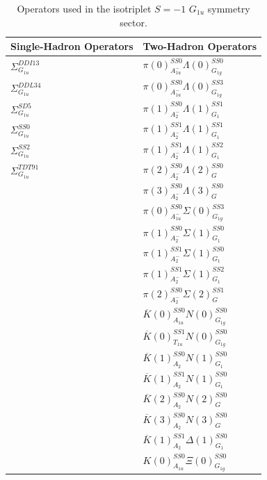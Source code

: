 \begin{table}[H]
    \centering
    \begin{tabular}{l|l}
        \textbf{Single-Hadron Operators} & \textbf{Two-Hadron Operators} \\
        \hline
        $\Sigma_{G_{1u}}^{DDI13}$ & $\pi(0)_{A_{1u}^-}^{SS0}\Lambda(0)_{G_{1g}}^{SS0}$\\
        $\Sigma_{G_{1u}}^{DDL34}$ & $\pi(0)_{A_{1u}^-}^{SS0}\Lambda(0)_{G_{1g}}^{SS3}$\\
        $\Sigma_{G_{1u}}^{SD5}$ & $\pi(1)_{A_2^-}^{SS0}\Lambda(1)_{G_1}^{SS1}$\\
        $\Sigma_{G_{1u}}^{SS0}$ & $\pi(1)_{A_2^-}^{SS1}\Lambda(1)_{G_1}^{SS1}$\\
        $\Sigma_{G_{1u}}^{SS2}$ & $\pi(1)_{A_2^-}^{SS1}\Lambda(1)_{G_1}^{SS2}$\\
        $\Sigma_{G_{1u}}^{TDT91}$ & $\pi(2)_{A_2^-}^{SS0}\Lambda(2)_{G}^{SS0}$\\
         & $\pi(3)_{A_2^-}^{SS0}\Lambda(3)_{G}^{SS0}$\\
         & $\pi(0)_{A_{1u}^-}^{SS0}\Sigma(0)_{G_{1g}}^{SS3}$\\
         & $\pi(1)_{A_2^-}^{SS0}\Sigma(1)_{G_1}^{SS0}$\\
         & $\pi(1)_{A_2^-}^{SS1}\Sigma(1)_{G_1}^{SS0}$\\
         & $\pi(1)_{A_2^-}^{SS1}\Sigma(1)_{G_1}^{SS2}$\\
         & $\pi(2)_{A_2^-}^{SS0}\Sigma(2)_{G}^{SS1}$\\
         & $\overline K(0)_{A_{1u}}^{SS0}N(0)_{G_{1g}}^{SS0}$\\
         & $\overline K(0)_{T_{1u}}^{SS1}N(0)_{G_{1g}}^{SS0}$\\
         & $\overline K(1)_{A_2}^{SS0}N(1)_{G_1}^{SS0}$\\
         & $\overline K(1)_{A_2}^{SS1}N(1)_{G_1}^{SS0}$\\
         & $\overline K(2)_{A_2}^{SS0}N(2)_{G}^{SS0}$\\
         & $\overline K(3)_{A_2}^{SS0}N(3)_{G}^{SS0}$\\
         & $\overline K(1)_{A_2}^{SS1}\Delta(1)_{G_1}^{SS0}$\\
         & $K(0)_{A_{1u}}^{SS0}\Xi(0)_{G_{1g}}^{SS0}$        
    \end{tabular}
    \caption{Operators used in the isotriplet $S=-1$ $G_{1u}$ symmetry sector.}\label{table:g1u_ops}
\end{table}

